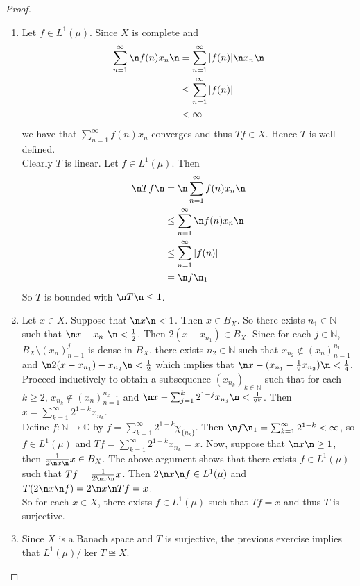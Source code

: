 \documentclass[12pt]{amsart}
\newcommand{\C}{\mathbb{C}}
\newcommand{\N}{\mathbb{N}}
\begin{document}
\begin{proof}
	\begin{enumerate}
		\item Let $f \in L^1(\mu)$. Since $X$ is complete and 
		\begin{align*}
			\sum_{n=1}^{\infty}\n f(n)x_n \n
			& = \sum_{n=1}^{\infty} \vert f(n) \vert \n x_n \n \\
			& \leq \sum_{n=1}^{\infty} \vert f(n) \vert \\
			&< \infty 
		\end{align*}
		we have that $\sum_{n=1}^{\infty} f(n)x_n $ converges and thus $Tf \in X$. Hence $T$ is well defined. \vspace{.5cm}\\
		Clearly $T$ is linear. Let $f \in L^1(\mu)$. Then
		\begin{align*}
			\n Tf \n 
			&= \n  \sum_{n=1}^{\infty} f(n)x_n \n \\
			& \leq \sum_{n=1}^{\infty} \n f(n)x_n \n \\
			& \leq \sum_{n=1}^{\infty} \vert f(n) \vert \\
			&= \n f \n_1
		\end{align*}
		So $T$ is bounded with $\n T \n \leq 1$.\vspace{.5cm}\\
		\item Let $x \in X$. Suppose that $\n x \n < 1$. Then $x \in B_X$. So there exists $n_1 \in \N$ such that $\n x - x_{n_1} \n < \frac{1}{2}$. Then $2(x-x_{n_1}) \in B_X$. Since for each $j \in \N$, $B_X\setminus (x_n)_{n=1}^j$ is dense in $B_X$, there exists $n_2 \in \N$ such that $x_{n_2} \not \in (x_n)_{n=1}^{n_1}$ and $\n 2(x- x_{n_1}) - x_{n_2} \n < \frac{1}{2}$ which implies that $\n x- (x_{n_1} - \frac{1}{2}x_{n_2}) \n < \frac{1}{4}$. \vspace{.5cm}\\ 
		Proceed inductively to obtain a subsequence $(x_{n_k})_{k \in \N}$ such that for each $k \geq 2$, $x_{n_k} \not \in (x_n)_{n=1}^{n_{k-1}}$ and $\n x - \sum_{j=1}^k 2^{1-j}x_{n_j} \n < \frac{1}{2^k}$. Then $x = \sum_{k=1}^{\infty}2^{1-k}x_{n_k}$. \vspace{.5cm} \\ 
		Define $f:\N \rightarrow \C$ by $f = \sum_{k=1}^{\infty}2^{1-k}\chi_{\{n_k\}}$. Then $\n f \n_1 = \sum_{k=1}^{\infty}2^{1-k}< \infty$, so $f \in L^1(\mu)$ and $Tf = \sum_{k=1}^{\infty}2^{1-k}x_{n_k} = x$. Now, suppose that $\n x \n \geq 1$, then $\frac{1}{2\n x \n}x \in B_X$. The above argument shows that there exists $f \in L^1(\mu)$ such that $Tf = \frac{1}{2\n x \n}x$. Then $2 \n x \n f \in L^1(\mu)$ and $T(2 \n x \n f) = 2 \n x \n Tf =x$. \\
		So for each $x \in X$, there exists $f \in L^1(\mu)$ such that $Tf = x$ and thus $T$ is surjective. 
		\item Since $X$ is a Banach space and $T$ is surjective, the previous exercise implies that $L^1(\mu)/\ker T \cong X$. 
	\end{enumerate}
\end{proof}
\end{document}

